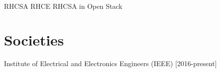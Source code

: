 \documentclass[letterpaper,dvipsnames]{deedy-resume} %
\begin{document}
\begin{minipage}[t]{0.33\textwidth}

RHCSA 
RHCE 
RHCSA in Open Stack 

\sectionspace %



\section{Societies} 

Institute of Electrical and Electronics Engineers (IEEE) [2016-present]

\sectionspace %


\end{minipage} %
\hfill
%
%
\end{document}
